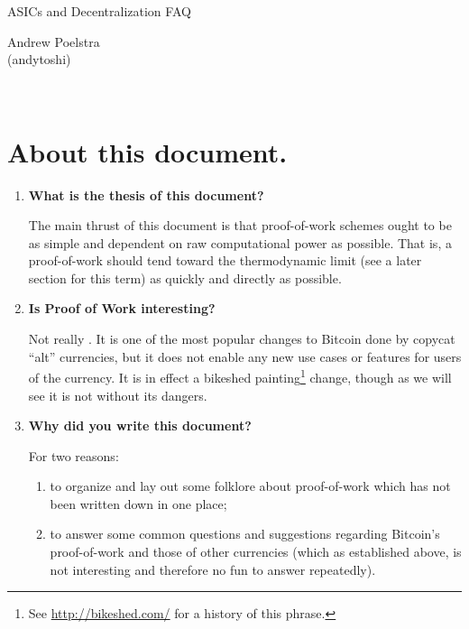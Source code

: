 \documentclass[letterpaper]{article}
\theoremstyle{xxx}
\theoremstyle{evil}
\theoremstyle{yyy}
\theoremstyle{plain}
\theoremstyle{zzz}
\begin{document}
\begin{minipage}[b]{0.7\linewidth}
{\huge ASICs and Decentralization FAQ}
\end{minipage}
\begin{minipage}[b]{0.3\linewidth}
  \begin{flushright}
    Andrew Poelstra\\(andytoshi)
  \end{flushright}
\end{minipage}
\\

\section{About this document.}
\begin{enumerate}
\item \textbf{What is the thesis of this document?}

The main thrust of this document is that proof-of-work schemes ought
to be as simple and dependent on raw computational power as possible.
That is, a proof-of-work should tend toward the thermodynamic limit
(see a later section for this term) as quickly and directly as possible.

\item \textbf{Is Proof of Work interesting?}

Not really \smiley. It is one of the most popular changes to Bitcoin done
by copycat ``alt'' currencies, but it does not enable any new use cases
or features for users of the currency. It is in effect a bikeshed
painting\footnote{See \url{http://bikeshed.com/} for a history of this
phrase.} change, though as we will see it is not without its dangers.

\item \textbf{Why did you write this document?}

For two reasons:
\begin{enumerate}
\item to organize and lay out some folklore about proof-of-work which has
not been written down in one place;
\item to answer some common questions and suggestions regarding Bitcoin's
proof-of-work and those of other currencies (which as established above,
is not interesting and therefore no fun to answer repeatedly).
\end{enumerate}

\end{enumerate}
\end{document}
